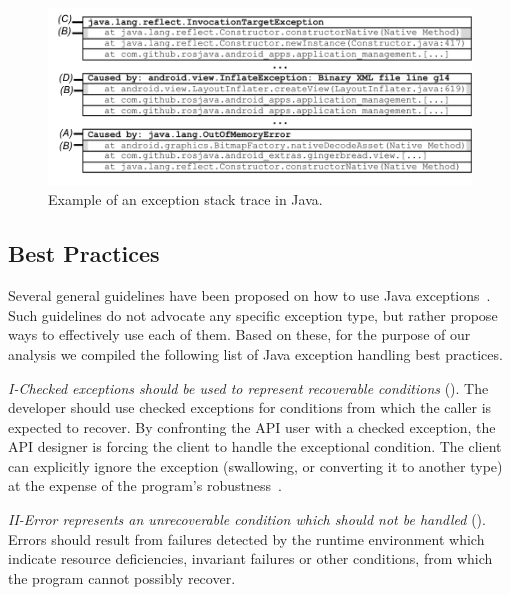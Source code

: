 \begin{figure} \centering \includegraphics[scale=0.55]{stack_review6.png}
\caption{Example of an exception stack trace in Java.}
\label{fig:wrapping}
\end{figure}

\subsection{Best Practices}
\label{sec:best}

Several general guidelines have been proposed on how to use Java
exceptions~\cite{mandrioli1992advances,gosling2000java,wirfs2006toward,
bloch2008effective}. Such guidelines do not
advocate any specific exception type, but rather propose ways to effectively use each of them.
Based on these, for the purpose of our analysis we compiled the following list of Java exception handling best practices.


\emph{I-Checked exceptions should be used to represent recoverable
conditions} (\cite{mandrioli1992advances,gosling2000java,wirfs2006toward,bloch2008effective}).
The developer should use checked exceptions for conditions from which the caller
is expected to recover. By confronting the API user with a checked exception,
the API designer is forcing the client to handle the exceptional condition. The
client can explicitly ignore the exception (swallowing, or converting it to
another type) at the expense of the program's robustness~\cite{gosling2000java}.

\emph{II-Error represents an unrecoverable condition which should not be handled} 
(\cite{gosling2000java}).  Errors should result from failures detected
by the runtime environment which indicate resource deficiencies, invariant
failures or other conditions, from which the program cannot possibly recover.


